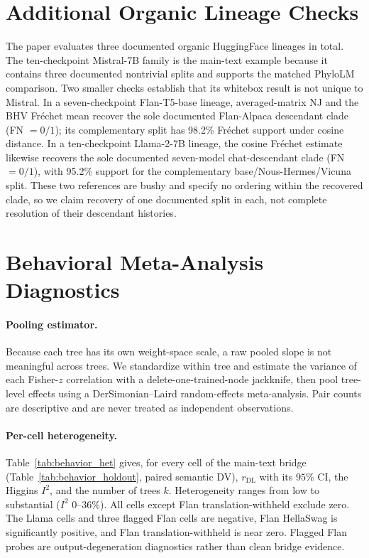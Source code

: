 \documentclass{article}
\theoremstyle{definition}
\theoremstyle{plain}
\begin{document}
\section{Additional Organic Lineage Checks}
\label{app:organic-additional}

The paper evaluates three documented organic HuggingFace lineages in total. The ten-checkpoint
Mistral-7B family is the main-text example because it contains three documented nontrivial splits and
supports the matched PhyloLM comparison. Two smaller checks establish that its whitebox result is not
unique to Mistral. In a seven-checkpoint Flan-T5-base lineage, averaged-matrix NJ and the BHV Fr\'echet
mean recover the sole documented Flan-Alpaca descendant clade (FN $=0/1$); its complementary split has
98.2\% Fr\'echet support under cosine distance. In a ten-checkpoint Llama-2-7B lineage, the cosine
Fr\'echet estimate likewise recovers the sole documented seven-model chat-descendant clade (FN
$=0/1$), with 95.2\% support for the complementary base/Nous-Hermes/Vicuna split. These two references
are bushy and specify no ordering within the recovered clade, so we claim recovery of one documented
split in each, not complete resolution of their descendant histories.


\section{Behavioral Meta-Analysis Diagnostics}
\label{app:regression}

\paragraph{Pooling estimator.} Because each tree has its own weight-space scale, a raw pooled slope is
not meaningful across trees. We standardize within tree and estimate the variance of each Fisher-$z$
correlation with a delete-one-trained-node jackknife, then pool tree-level effects using a
DerSimonian--Laird random-effects meta-analysis. Pair counts are descriptive and are never treated as
independent observations.

\paragraph{Per-cell heterogeneity.} Table~\ref{tab:behavior_het} gives, for every cell of the main-text
bridge (Table~\ref{tab:behavior_holdout}, paired semantic DV), $r_{\mathrm{DL}}$ with its $95\%$ CI,
the Higgins $I^2$, and the number of trees $k$. Heterogeneity ranges from low to substantial ($I^2$ $0$--$36\%$).
All cells except Flan translation-withheld exclude zero. The Llama cells and three flagged Flan cells
are negative, Flan HellaSwag is significantly positive, and Flan translation-withheld is near zero.
Flagged Flan probes are output-degeneration diagnostics rather than clean bridge evidence.
\end{document}
